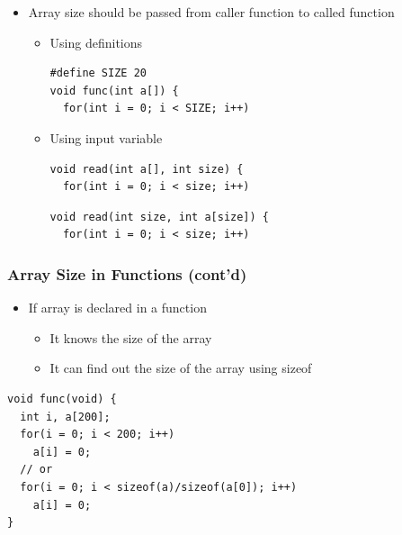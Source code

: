 \documentclass{../c-lecture}
\begin{document}
\begin{frame}[fragile]
  \begin{itemize}
    \item
      Array size should be passed from caller function to called function
    \begin{itemize}
      \item Using definitions
      \begin{verbatim}
#define SIZE 20
void func(int a[]) {
  for(int i = 0; i < SIZE; i++)
      \end{verbatim}
      \item Using input variable
      \begin{verbatim}
void read(int a[], int size) {
  for(int i = 0; i < size; i++)
      \end{verbatim}
      \begin{verbatim}
void read(int size, int a[size]) {
  for(int i = 0; i < size; i++)
      \end{verbatim}
    \end{itemize}
  \end{itemize}
\end{frame}

\begin{frame}[fragile]
  \frametitle{Array Size in Functions (cont'd)}
  \begin{itemize}
    \item If array is declared in a function
    \begin{itemize}
      \item It knows the size of the array
      \item
        It {\color{Orange} can} find out the size of the array
        using {\color{LimeGreen} sizeof}
    \end{itemize}
  \end{itemize}
  \begin{verbatim}
void func(void) {
  int i, a[200];
  for(i = 0; i < 200; i++)
    a[i] = 0;
  // or
  for(i = 0; i < sizeof(a)/sizeof(a[0]); i++)
    a[i] = 0;
}
  \end{verbatim}
\end{frame}
\end{document}
